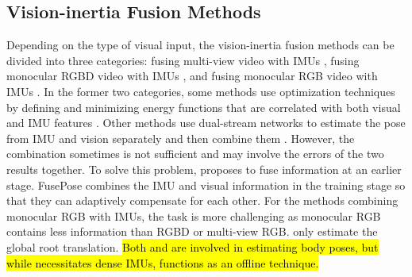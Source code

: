 \subsection{Vision-inertia Fusion Methods}
%
Depending on the type of visual input, the vision-inertia fusion methods can be divided into three categories: fusing multi-view video with IMUs \cite{pons2010multisensor,vonmarcardponsmollPAMI16,TotalCapture,malleson2020real,RealTimeFM,gilbert2019fusing,FusingWI,moniruzzaman2021wearable,bao2022fusepose,huang2020deepfuse}, fusing monocular RGBD video with IMUs \cite{helten2013real,zheng2018hybridfusion}, and fusing monocular RGB video with IMUs \cite{VIP,HybridCap,kaichi2020resolving,henschel2020accurate,henschel2019simultaneous}.
%
%
In the former two categories, some methods use optimization techniques by defining and minimizing energy functions that are correlated with both visual and IMU features \cite{vonmarcardponsmollPAMI16, RealTimeFM,pons2010multisensor,malleson2020real}.  
%
Other methods use dual-stream networks to estimate the pose from IMU and vision separately and then combine them \cite{TotalCapture,gilbert2019fusing}.  
%
However, the combination sometimes is not sufficient and may involve the errors of the two results together.
%
To solve this problem, \cite{FusingWI} proposes to fuse information at an earlier stage.  
%
%
FusePose \cite{bao2022fusepose} combines the IMU and visual information in the training stage so that they can adaptively compensate for each other.
%
%
%
For the methods combining monocular RGB with IMUs, the task is more challenging as monocular RGB contains less information than RGBD or multi-view RGB.
%
\cite{henschel2020accurate,henschel2019simultaneous} only estimate the global root translation.
%
\hl{Both \cite{kaichi2020resolving} and \cite{VIP} are involved in estimating body poses, but while \cite{kaichi2020resolving} necessitates dense IMUs, \cite{VIP} functions as an offline technique.}

